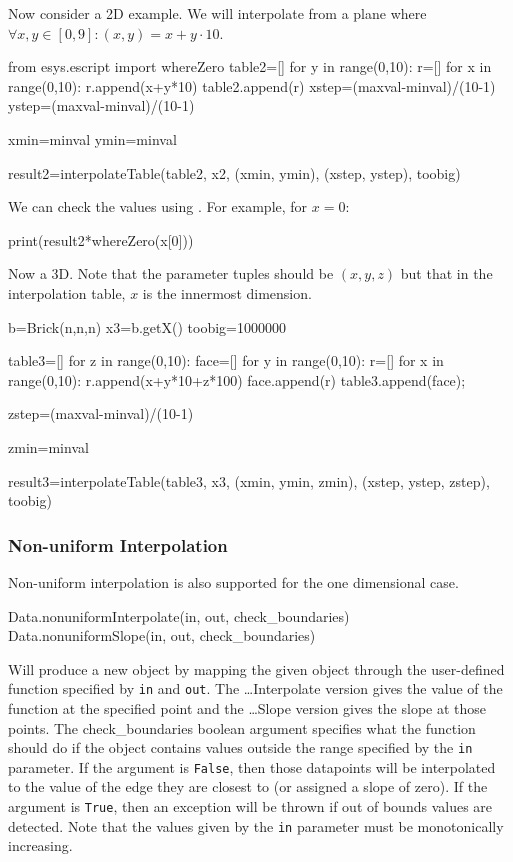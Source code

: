 Now consider a 2D example. We will interpolate from a plane where $\forall x,y\in[0,9]:(x,y)=x+y\cdot10$.

\begin{python}
from esys.escript import whereZero
table2=[]
for y in range(0,10):
      r=[]
      for x in range(0,10):
	 r.append(x+y*10)
      table2.append(r)
xstep=(maxval-minval)/(10-1)
ystep=(maxval-minval)/(10-1)

xmin=minval
ymin=minval

result2=interpolateTable(table2, x2, (xmin, ymin), (xstep, ystep), toobig)
\end{python}

We can check the values using .
For example, for $x=0$:
\begin{python}
print(result2*whereZero(x[0])) 
\end{python}

Now a 3D. Note that the parameter tuples should be $(x,y,z)$ but that in the interpolation table, $x$ is the innermost dimension.
\begin{python}
b=Brick(n,n,n)
x3=b.getX()
toobig=1000000

table3=[]
for z in range(0,10):
   face=[]
   for y in range(0,10):
      r=[]
      for x in range(0,10):
	 r.append(x+y*10+z*100)
      face.append(r)
   table3.append(face);

zstep=(maxval-minval)/(10-1)

zmin=minval

result3=interpolateTable(table3, x3, (xmin, ymin, zmin), (xstep, ystep, zstep), toobig)
\end{python}


\subsubsection{Non-uniform Interpolation}
Non-uniform interpolation is also supported for the one dimensional case.
\begin{python}
Data.nonuniformInterpolate(in, out, check_boundaries)
Data.nonuniformSlope(in, out, check_boundaries)
\end{python}

Will produce a new \Data object by mapping the given \Data object through the user-defined function
specified by \texttt{in} and \texttt{out}.
The \ldots Interpolate version gives the value of the function at the specified point and the 
\ldots Slope version gives the slope at those points.
The check_boundaries boolean argument specifies what the function should do if the \Data object contains
values outside the range specified by the \texttt{in} parameter.
If the argument is \texttt{False}, then those datapoints will be interpolated to the value of the edge 
they are closest to (or assigned a slope of zero).
If the argument is \texttt{True}, then an exception will be thrown if out of bounds values are detected.
Note that the values given by the \texttt{in} parameter must be monotonically increasing.

